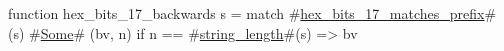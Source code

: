 function hex_bits_17_backwards s =
  match #\hyperref[sailRISCVzhexzybitszy17zymatcheszyprefix]{hex\_bits\_17\_matches\_prefix}#(s) {
      #\hyperref[sailRISCVzSome]{Some}# (bv, n) if n == #\hyperref[sailRISCVzstringzylength]{string\_length}#(s) => bv
  }
